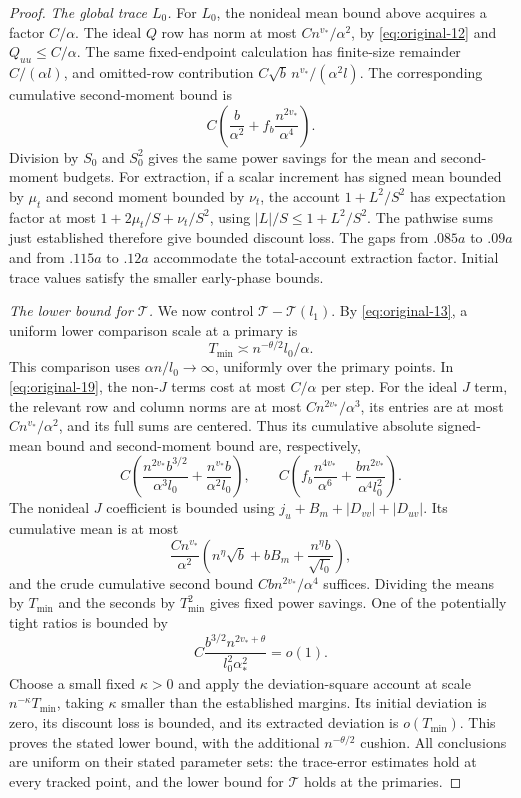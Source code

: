 \begin{proof}
\emph{The global trace $L_0$.}
For $L_0$, the nonideal mean bound above acquires a factor $C/\alpha$.
The ideal $Q$ row has norm at most $Cn^{v_*}/\alpha^2$, by
\eqref{eq:original-12} and $Q_{uu}\leq C/\alpha$.
The same fixed-endpoint calculation has finite-size remainder
$C/(\alpha l)$, and omitted-row contribution
$C\sqrt b\,n^{v_*}/(\alpha^2l)$.
The corresponding cumulative second-moment bound is
\[
 C\left(\frac b{\alpha^2}+
              f_b\frac{n^{2v_*}}{\alpha^4}\right).
\]
Division by $S_0$ and $S_0^2$ gives the same power savings for
the mean and second-moment budgets.  For extraction, if a scalar
increment has signed mean bounded by $\mu_t$ and second moment
bounded by $\nu_t$, the account
$1+L^2/S^2$ has expectation factor at most
$1+2\mu_t/S+\nu_t/S^2$, using
$|L|/S\leq1+L^2/S^2$.  The pathwise sums just established therefore
give bounded discount loss.  The gaps from $.085a$ to $.09a$ and
from $.115a$ to $.12a$ accommodate the total-account extraction
factor.  Initial trace values satisfy the smaller early-phase bounds.

\emph{The lower bound for $\mathcal T$.}
We now control $\mathcal T-\mathcal T(l_1)$.  By
\eqref{eq:original-13}, a uniform lower comparison scale at a primary is
\[
 T_{\min}\asymp n^{-\theta/2}l_0/\alpha.
\]
This comparison uses $\alpha n/l_0\to\infty$, uniformly over the
primary points.  In \eqref{eq:original-19}, the non-$J$ terms cost
at most $C/\alpha$ per step.  For the ideal $J$ term, the relevant
row and column norms are at most $Cn^{2v_*}/\alpha^3$, its entries
are at most $Cn^{v_*}/\alpha^2$, and its full sums are centered.
Thus its cumulative absolute signed-mean bound and second-moment
bound are, respectively,
\[
 C\left(\frac{n^{2v_*}b^{3/2}}{\alpha^3l_0}
          +\frac{n^{v_*}b}{\alpha^2l_0}\right),
 \qquad
 C\left(f_b\frac{n^{4v_*}}{\alpha^6}
          +\frac{bn^{2v_*}}{\alpha^4l_0^2}\right).
\]
The nonideal $J$ coefficient is bounded using
$j_u+B_m+|D_{vv}|+|D_{uv}|$.  Its cumulative mean is at most
\[
 \frac{Cn^{v_*}}{\alpha^2}
 \left(n^\eta\sqrt b+bB_m+
                      \frac{n^\eta b}{\sqrt{l_0}}\right),
\]
and the crude cumulative second bound
$Cbn^{2v_*}/\alpha^4$ suffices.  Dividing the means by $T_{\min}$
and the seconds by $T_{\min}^2$ gives fixed power savings.  One of
the potentially tight ratios is bounded by
\[
 C\frac{b^{3/2}n^{2v_*+\theta}}
                {l_0^2\alpha_*^2}=o(1).
\]
Choose a small fixed $\kappa>0$ and apply the deviation-square
account at scale $n^{-\kappa}T_{\min}$, taking $\kappa$ smaller
than the established margins.  Its initial deviation is zero, its
discount loss is bounded, and its extracted deviation is
$o(T_{\min})$.  This proves the stated lower bound, with the
additional $n^{-\theta/2}$ cushion.  All conclusions are uniform
on their stated parameter sets: the trace-error estimates hold at
every tracked point, and the lower bound for $\mathcal T$ holds at
the primaries.
\end{proof}

